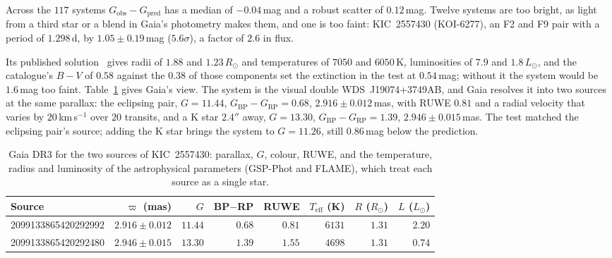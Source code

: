\documentclass[3p,11pt]{elsarticle}
\begin{document}
Across the $117$ systems $G_\mathrm{obs}-G_\mathrm{pred}$ has a median of $-0.04$\,mag
and a robust scatter of $0.12$\,mag. Twelve systems are too bright, as light from a
third star or a blend in Gaia's photometry makes them, and one is too faint:
KIC~2557430 (KOI-6277), an F2 and F9 pair with a period of $1.298$\,d, by
$1.05\pm0.19$\,mag ($5.6\sigma$), a factor of $2.6$ in flux.

Its published solution~\cite{Hoyman2020} gives radii of $1.88$ and $1.23\,R_\odot$ and
temperatures of $7050$ and $6050$\,K, luminosities of $7.9$ and $1.8\,L_\odot$, and the
catalogue's $B-V$ of $0.58$ against the $0.38$ of those components set the extinction
in the test at $0.54$\,mag; without it the system would be $1.6$\,mag too faint.
Table~\ref{tab:gaia} gives Gaia's view. The system is the visual double
WDS~J19074+3749AB, and Gaia resolves it into two sources at the same parallax: the
eclipsing pair, $G=11.44$, $G_\mathrm{BP}-G_\mathrm{RP}=0.68$, $2.916\pm0.012$\,mas,
with RUWE $0.81$ and a radial velocity that varies by $20$\,km\,s$^{-1}$ over $20$
transits, and a K star $2.4''$ away, $G=13.30$, $G_\mathrm{BP}-G_\mathrm{RP}=1.39$,
$2.946\pm0.015$\,mas. The test matched the eclipsing pair's source; adding the K star
brings the system to $G=11.26$, still $0.86$\,mag below the prediction.

\begin{table}[t]
\centering\small
\caption{Gaia DR3 for the two sources of KIC~2557430: parallax, $G$, colour, RUWE, and the
temperature, radius and luminosity of the astrophysical parameters (GSP-Phot and FLAME),
which treat each source as a single star.}
\label{tab:gaia}
\begin{tabular}{lrrrrrrr}
\toprule
Source & $\varpi$ (mas) & $G$ & BP$-$RP & RUWE & $T_\mathrm{eff}$ (K) & $R$ ($R_\odot$) & $L$ ($L_\odot$) \\
\midrule
2099133865420292992 & $2.916\pm0.012$ & $11.44$ & $0.68$ & $0.81$ & $6131$ & $1.31$ & $2.20$ \\
2099133865420292480 & $2.946\pm0.015$ & $13.30$ & $1.39$ & $1.55$ & $4698$ & $1.31$ & $0.74$ \\
\bottomrule
\end{tabular}
\end{table}
\end{document}
